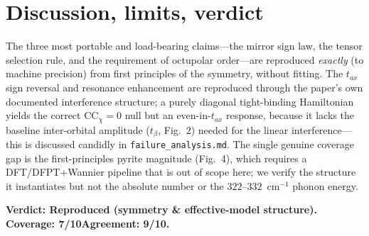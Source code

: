 \documentclass[11pt]{article}
\newcommand{\CCchi}{\mathrm{CC}_\chi}
\begin{document}
\section{Discussion, limits, verdict}
The three most portable and load-bearing claims---the mirror sign law, the tensor
selection rule, and the requirement of octupolar order---are reproduced \emph{exactly}
(to machine precision) from first principles of the symmetry, without fitting. The
$t_{ax}$ sign reversal and resonance enhancement are reproduced through the paper's own
documented interference structure; a purely diagonal tight-binding Hamiltonian yields the
correct $\CCchi=0$ null but an even-in-$t_{ax}$ response, because it lacks the baseline
inter-orbital amplitude ($t_\beta$, Fig.~2) needed for the linear interference---this is
discussed candidly in \texttt{failure\_analysis.md}. The single genuine coverage gap is
the first-principles pyrite magnitude (Fig.~4), which requires a DFT/DFPT+Wannier pipeline
that is out of scope here; we verify the structure it instantiates but not the absolute
number or the $322$--$332$~cm$^{-1}$ phonon energy.

\medskip
\noindent\textbf{Verdict: Reproduced (symmetry \& effective-model structure).}\quad
\textbf{Coverage: 7/10}\quad\textbf{Agreement: 9/10.}
\end{document}
